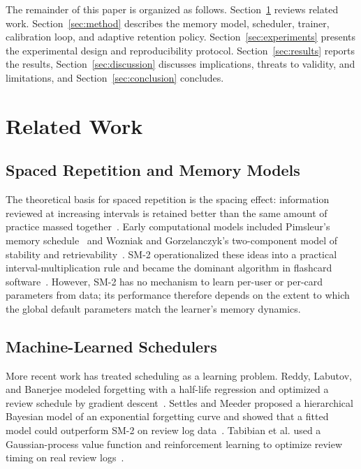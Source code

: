 \documentclass[conference]{IEEEtran}
\begin{document}
The remainder of this paper is organized as follows. Section~\ref{sec:related} reviews related work. Section~\ref{sec:method} describes the memory model, scheduler, trainer, calibration loop, and adaptive retention policy. Section~\ref{sec:experiments} presents the experimental design and reproducibility protocol. Section~\ref{sec:results} reports the results, Section~\ref{sec:discussion} discusses implications, threats to validity, and limitations, and Section~\ref{sec:conclusion} concludes.

\section{Related Work}\label{sec:related}

\subsection{Spaced Repetition and Memory Models}

The theoretical basis for spaced repetition is the spacing effect: information reviewed at increasing intervals is retained better than the same amount of practice massed together~\cite{roediger2006testing}. Early computational models included Pimsleur's memory schedule~\cite{pimsleur1967} and Wozniak and Gorzelanczyk's two-component model of stability and retrievability~\cite{wozniak1994optimization}. SM-2 operationalized these ideas into a practical interval-multiplication rule and became the dominant algorithm in flashcard software~\cite{wozniak1990sm2}. However, SM-2 has no mechanism to learn per-user or per-card parameters from data; its performance therefore depends on the extent to which the global default parameters match the learner's memory dynamics.

\subsection{Machine-Learned Schedulers}

More recent work has treated scheduling as a learning problem. Reddy, Labutov, and Banerjee modeled forgetting with a half-life regression and optimized a review schedule by gradient descent~\cite{reddy2016latent}. Settles and Meeder proposed a hierarchical Bayesian model of an exponential forgetting curve and showed that a fitted model could outperform SM-2 on review log data~\cite{settles2016trainable}. Tabibian et al. used a Gaussian-process value function and reinforcement learning to optimize review timing on real review logs~\cite{tabibian2019optimizing}.
\end{document}
